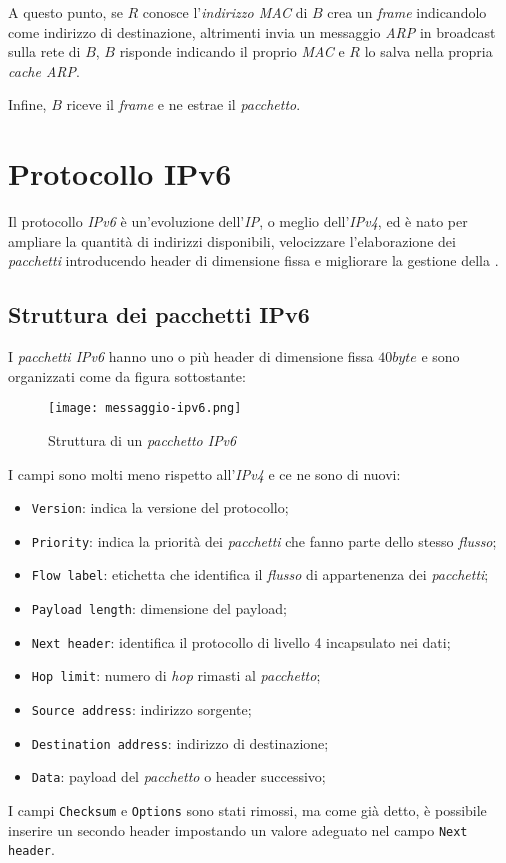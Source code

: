A questo punto, se $R$ conosce l'\emph{indirizzo MAC} di $B$ crea un \emph{frame}
indicandolo come indirizzo di destinazione, altrimenti invia un messaggio
\emph{ARP} in broadcast sulla rete di $B$, $B$ risponde indicando il proprio
\emph{MAC} e $R$ lo salva nella propria \emph{cache ARP}.

Infine, $B$ riceve il \emph{frame} e ne estrae il \emph{pacchetto}.

\section{Protocollo IPv6}
Il protocollo \emph{IPv6} è un'evoluzione dell'\emph{IP}, o meglio dell'\emph{IPv4},
ed è nato per ampliare la quantità di indirizzi disponibili, velocizzare
l'elaborazione dei \emph{pacchetti} introducendo header di dimensione fissa e
migliorare la gestione della .

\subsection{Struttura dei pacchetti IPv6}
I \emph{pacchetti IPv6} hanno uno o più header di dimensione fissa $40byte$
e sono organizzati come da figura sottostante:
\begin{figure}[h!]
    \centering
    \texttt{[image: messaggio-ipv6.png]}
    \caption{Struttura di un \emph{pacchetto IPv6}}
\end{figure}
I campi sono molti meno rispetto all'\emph{IPv4} e ce ne sono di nuovi:
\begin{itemize}
    \item \texttt{Version}: indica la versione del protocollo;
    \item \texttt{Priority}: indica la priorità dei \emph{pacchetti} che fanno
    parte dello stesso \emph{flusso};
    \item \texttt{Flow label}: etichetta che identifica il \emph{flusso}
    di appartenenza dei \emph{pacchetti};
    \item \texttt{Payload length}: dimensione del payload;
    \item \texttt{Next header}: identifica il protocollo di livello 4 incapsulato
    nei dati;
    \item \texttt{Hop limit}: numero di \emph{hop} rimasti al \emph{pacchetto};
    \item \texttt{Source address}: indirizzo sorgente;
    \item \texttt{Destination address}: indirizzo di destinazione;
    \item \texttt{Data}: payload del \emph{pacchetto} o header successivo;
\end{itemize}
I campi \texttt{Checksum} e \texttt{Options} sono stati rimossi, ma come già
detto, è possibile inserire un secondo header impostando un valore adeguato nel
campo \texttt{Next header}.

